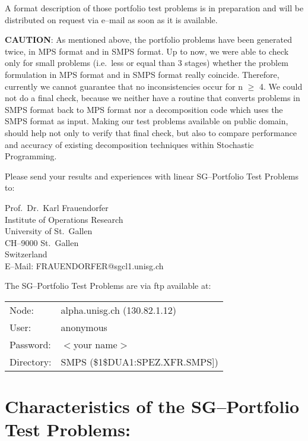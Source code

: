 A format description of those portfolio test problems is in preparation and will be distributed on request via e--mail as soon as it is available.

\noindent
{\bf CAUTION}: As mentioned above, the portfolio problems have been generated twice, in MPS format and in SMPS format.
Up to now, we were able to check only for small problems (i.e.\ less or equal than 3 stages) whether the problem formulation in MPS format and in SMPS format really coincide. Therefore, currently we cannot guarantee that no inconsistencies occur for n $\geq$ 4.
We could not do a final check, because we neither have a routine that converts problems in SMPS format back to MPS format nor a decomposition code which uses the SMPS format as input. 
Making our test problems available on public domain, should help not only to verify that final check, but also to compare performance and accuracy of existing decomposition techniques within Stochastic Programming.

Please send your results and experiences with linear SG--Portfolio Test Problems to:

\bigskip

\noindent
Prof.\ Dr.\ Karl Frauendorfer\\
Institute of Operations Research\\
University of St.\ Gallen\\
CH--9000 St.\ Gallen\\
Switzerland\\

\noindent
E--Mail: FRAUENDORFER@sgcl1.unisg.ch

\bigskip

\newpage

\noindent
The SG--Portfolio Test Problems are via ftp available at:

\begin{tabular}{ll} 
Node: & alpha.unisg.ch (130.82.1.12)\\
User: & anonymous \\
Password: & $<$your name$>$ \\
Directory: & SMPS (\$1\$DUA1:SPEZ.XFR.SMPS]) \\
\end{tabular}


\newpage

\section*{Characteristics of the SG--Portfolio Test Problems:}

